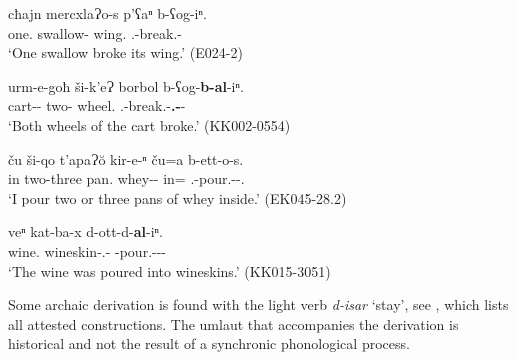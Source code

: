 \begin{exe}
	\ex\label{verbderiv-ex08}
	\begin{xlist}
		
		
			\ex\label{verbderiv-ex8a}
			\gll cħajn mercxlaɁo-s p'ʕaⁿ b-ʕog-iⁿ. \\
			one.{\Obl} swallow-{\Erg} wing.{\Nom} {\B}.{\Sg}-break.{\Pfv}-{\Aor} \\
			\trans `One swallow broke its wing.'
			\hfill (E024-2)
		
		
		
			\ex\label{verbderiv-ex08b}
			\gll urm-e-goħ ši-k'eɁ borbol b-ʕog-\textbf{b-al}-iⁿ. \\
			cart-{\Obl}-{\Adess} two-{\Incl} wheel.{\Nom} {\B}.{\Sg}-break.{\Pfv}-\textbf{{\B}.{\Sg}-{\Intr}}-{\Aor} \\
			\trans `Both wheels of the cart broke.' 
			\hfill (KK002-0554)
		
		
	\end{xlist}
\end{exe}

\begin{exe}
	\ex\label{verbderiv-ex09}
	\begin{xlist}
		
		
			\ex\label{verbderiv-ex09a}
			\gll ču ši-qo t'apaɁ\u{o} kir-e-ⁿ ču=a b-ett-o-s. \\
			in two-three pan.{\Nom} whey-{\Obl}-{\Gen} in={\Emph} {\B}.{\Sg}-pour.{\Ipfv}-{\Npst}-{\Fsg}.{\Erg}\\
			\trans `I pour two or three pans of whey inside.'
			\hfill (EK045-28.2)
		
		
		
			\ex\label{verbderiv-ex09b}
			\gll veⁿ kat-ba-x d-ott-d-\textbf{al}-iⁿ.  \\
			wine.{\Nom} wineskin-{\Obl}.{\Pl}-{\Cont} {\D}-pour.{\Pfv}-{\D}-\textbf{{\Intr}}-{\Aor} \\
			\trans `The wine was poured into wineskins.'
			\hfill (KK015-3051)
		
		
	\end{xlist}
\end{exe}

Some archaic derivation is found with the light verb \textit{d-isar} `stay', see , which lists all attested constructions. The umlaut that accompanies the derivation is historical and not the result of a synchronic phonological process.



